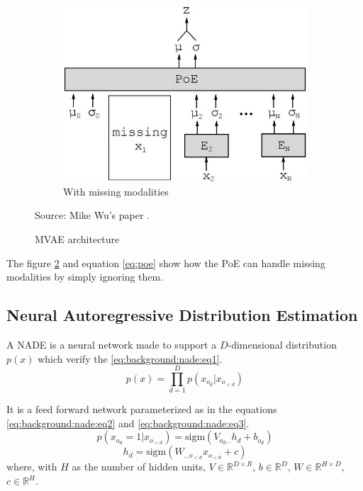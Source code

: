 \documentclass[12pt]{report}
\begin{document}
\begin{figure}[h]
\begin{subfigure}[t]{0.49\textwidth}
        \includegraphics[width=.9 \textwidth]{images/nn/architectures/mvae_missing.jpg}
        \caption{With missing modalities}
        \label{fig:mvae_architecture_missing}
    \end{subfigure}
    \caption{MVAE architecture}
    Source: Mike Wu's paper \cite{wu_multimodal_2018}.
    \label{fig:mvae_architecture}
\end{figure}

The figure \ref{fig:mvae_architecture} and equation \ref{eq:poe} show how the PoE can handle missing modalities by simply ignoring them.

\subsection{Neural Autoregressive Distribution Estimation}
\label{sec:back:nade}

A NADE \cite{uria_neural_2016, uria_deep_2014} is a neural network made to support a $D$-dimensional distribution $p(x)$ which verify the \ref{eq:background:nade:eq1}.
\begin{equation}
    p(x) = \prod_{d=1}^{D} p(x_{o_{d}} | x_{o_{<d}})
    \label{eq:background:nade:eq1}
\end{equation}

It is a feed forward network parameterized as in the equations \ref{eq:background:nade:eq2} and \ref{eq:background:nade:eq3}.
\begin{equation}
    p(x_{o_{d}} = 1 | x_{o_{<d}}) = \text{sigm}(V_{o_{d}, .} h_{d} + b_{o_{d}})
    \label{eq:background:nade:eq2}
\end{equation}
\begin{equation}
    h_d = \text{sigm}(W_{., o_{<d}} x_{o_{<d}} + c)
    \label{eq:background:nade:eq3}
\end{equation}
where, with $H$ as the number of hidden units, $V \in \mathbb{R}^{D \times R}$, $b \in \mathbb{R}^{D}$, $W \in \mathbb{R}^{H \times D}$, $c \in \mathbb{R}^{H}$.
\end{document}
